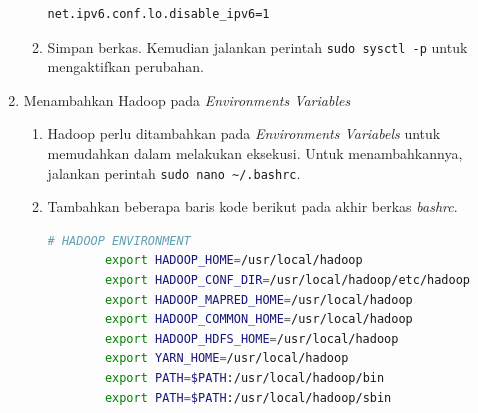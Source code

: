 \begin{enumerate}
\begin{enumerate}
\begin{lstlisting}[language=bash]
		net.ipv6.conf.lo.disable_ipv6=1
      \end{lstlisting}
    \item Simpan berkas. Kemudian jalankan perintah \verb|sudo sysctl -p| untuk mengaktifkan perubahan.
  \end{enumerate}
  \item Menambahkan Hadoop pada \textit{Environments Variables}
  \begin{enumerate}
    \item Hadoop perlu ditambahkan pada \textit{Environments Variabels} untuk memudahkan dalam melakukan eksekusi. Untuk menambahkannya, jalankan perintah \verb|sudo nano ~/.bashrc|.
    \item Tambahkan beberapa baris kode berikut pada akhir berkas \textit{bashrc}.
      \begin{lstlisting}[language=bash]
		# HADOOP ENVIRONMENT
		export HADOOP_HOME=/usr/local/hadoop
		export HADOOP_CONF_DIR=/usr/local/hadoop/etc/hadoop
		export HADOOP_MAPRED_HOME=/usr/local/hadoop
		export HADOOP_COMMON_HOME=/usr/local/hadoop
		export HADOOP_HDFS_HOME=/usr/local/hadoop
		export YARN_HOME=/usr/local/hadoop
		export PATH=$PATH:/usr/local/hadoop/bin
		export PATH=$PATH:/usr/local/hadoop/sbin
		

\end{lstlisting}
\end{enumerate}
\end{enumerate}
